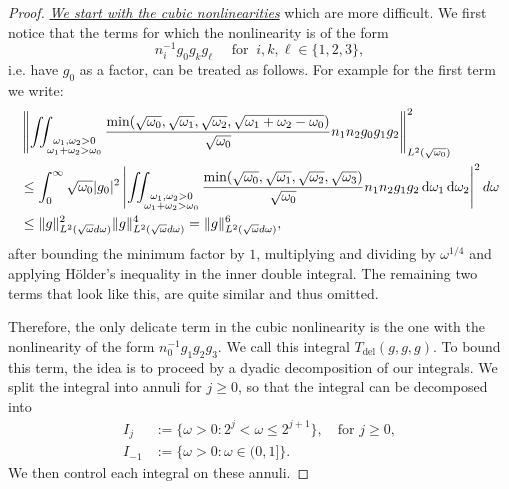 \documentclass[reqno,11pt,letterpaper]{amsart}
\numberwithin{equation}{section}
\newcommand{\dd}{\, {\rm d}}
\begin{document}
    \begin{proof}
        \noindent
\underline{\emph{We start with the cubic nonlinearities}} which are more difficult. 
        We first notice that the terms for which the nonlinearity is of the form $$n_i^{-1}g_0g_kg_\ell \quad \text{ for }\ i, k, \ell \in \{1,2,3\},$$
        i.e. have $g_0$ as a factor, can be treated as follows. For example for the first term we write: 
        \begin{align*}
            &\left\| \iint_{\substack{\omega_1, \omega_2>0 \\ \omega_1+\omega_2>\omega_0}}  \frac{\text{min}(\sqrt{\omega_0},\sqrt{\omega_1},\sqrt{\omega_2},\sqrt{\omega_1+\omega_2-\omega_0})}{\sqrt{\omega_0}} 
   n_1n_2 g_0g_1g_2 \right\|_{L^2(\sqrt{\omega_0})}^2 \\
   & \leq \int_0^\infty \sqrt{\omega_0} |g_0|^2 \left\vert 
   \iint_{\substack{\omega_1, \omega_2>0 \\ \omega_1+\omega_2>\omega_0}}  \frac{\text{min}(\sqrt{\omega_0},\sqrt{\omega_1},\sqrt{\omega_2},\sqrt{\omega_3})}{\sqrt{\omega_0}} n_1n_2 g_1g_2 \dd \omega_1 \dd \omega_2
   \right\vert^2 d \omega  \\
   & \leq \|g\|_{L^2(\sqrt{\omega} d\omega)}^2\|g\|_{L^2(\sqrt{\omega} d\omega)}^4 = \|g\|_{L^2(\sqrt{\omega} d\omega)}^6, \end{align*}
        after bounding the minimum factor by $1$, multiplying and dividing by $\omega^{1/4}$ and applying H\"{o}lder's inequality in the inner double integral. The remaining two terms that look like this, are quite similar and thus omitted. 
        
Therefore,  the only delicate term in the cubic nonlinearity is the one with the nonlinearity of the form $n_0^{-1} g_1g_2g_3$. We call this integral $T_{\text{del}}(g,g,g)$.  
To bound this term, the idea is to proceed by a dyadic decomposition of
our integrals. We split the integral into annuli for $j \geq 0$,
so that the integral can be decomposed into 
\begin{align*} 
 I_j &:= \{ \omega >0: 2^{j} < \omega \leq 2^{j+1}\}, \quad \text{for } j\geq 0,  \\
 I_{-1}&:= \{ \omega >0: \omega \in (0,1]\}.
\end{align*}
We then control each integral on these annuli. 


\end{proof}
\end{document}
